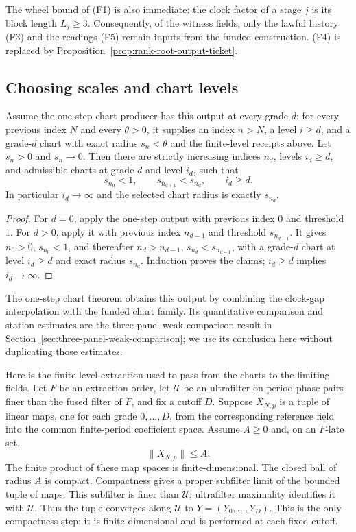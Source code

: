 The wheel bound of (F1) is also immediate: the clock factor of a stage
$j$ is its block length $L_j\ge3$. Consequently, of the witness fields,
only the lawful history (F3) and the readings (F5) remain inputs from the
funded construction. (F4) is replaced by
Proposition~\ref{prop:rank-root-output-ticket}.

\subsection{Choosing scales and chart levels}

\begin{lemma}
\label{lem:ex-lattice-firesky-selection}
Assume the one-step chart producer has this output at every grade $d$: for
every previous index $N$ and every $\theta>0$, it supplies an index $n>N$,
a level $i\geq d$, and a grade-$d$ chart with exact radius $s_n<\theta$
and the finite-level receipts above. Let $s_n>0$ and $s_n\to0$. Then
there are strictly increasing indices $n_d$, levels $i_d\geq d$, and
admissible charts at grade $d$ and level $i_d$, such that
\[
 s_{n_0}<1,\qquad s_{n_{d+1}}<s_{n_d},\qquad i_d\geq d.
\]
In particular $i_d\to\infty$ and the selected chart radius is exactly
$s_{n_d}$.
\end{lemma}
\begin{proof}
For $d=0$, apply the one-step output with previous index $0$ and threshold
$1$. For $d>0$, apply it with previous index $n_{d-1}$ and threshold
$s_{n_{d-1}}$. It gives $n_0>0$, $s_{n_0}<1$, and thereafter
$n_d>n_{d-1}$, $s_{n_d}<s_{n_{d-1}}$, with a grade-$d$ chart at level
$i_d\geq d$ and exact radius $s_{n_d}$. Induction proves the claims;
$i_d\geq d$ implies $i_d\to\infty$.
\end{proof}

The one-step chart theorem obtains this output by combining the clock-gap
interpolation with the funded chart family. Its quantitative comparison
and station estimates are the three-panel weak-comparison result in
Section~\ref{sec:three-panel-weak-comparison}; we use its conclusion here
without duplicating those estimates.

Here is the finite-level extraction used to pass from the charts to the
limiting fields. Let $F$ be an extraction order, let $\mathcal U$ be an
ultrafilter on period-phase pairs finer than the fused filter of $F$, and
fix a cutoff $D$. Suppose $X_{N,p}$ is a tuple of linear maps, one for
each grade $0,\ldots,D$, from the corresponding reference field into the
common finite-period coefficient space. Assume $A\geq0$ and, on an
$F$-late set,
\[
 \|X_{N,p}\|\leq A.
 \tag{1}\label{eq:ex-lattice-firesky-lift-bound}
\]
The finite product of these map spaces is finite-dimensional. The closed
ball of radius $A$ is compact. Compactness gives a proper subfilter limit
of the bounded tuple of maps. This subfilter is finer than $\mathcal U$;
ultrafilter maximality identifies it with $\mathcal U$. Thus the tuple
converges along $\mathcal U$ to $Y=(Y_0,\ldots,Y_D)$. This is the only
compactness step: it is finite-dimensional and is performed at each fixed
cutoff.

